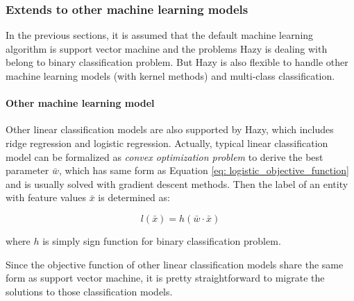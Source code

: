 \subsubsection{Extends to other machine learning models}
In the previous sections, it is assumed that the default machine learning algorithm is support vector machine and the problems Hazy is dealing with belong to binary classification problem. But Hazy is also flexible to handle other machine learning models (with kernel methods) and multi-class classification.

\paragraph{Other machine learning model}
Other linear classification models are also supported by Hazy, which includes ridge regression and logistic regression. Actually, typical linear classification model can be formalized as {\em convex optimization problem} to derive the best parameter $\bar{w}$, which has same form as Equation \ref{eq: logistic_objective_function} and is usually solved with gradient descent methods. Then the label of an entity with feature values $\bar{x}$ is determined as:

\begin{equation}
    l(\bar{x}) = h(\bar{w}\cdot\bar{x})
\end{equation}


where $h$ is simply sign function for binary classification problem.

Since the objective function of other linear classification models share the same form as support vector machine, it is pretty straightforward to migrate the solutions to those classification models.

